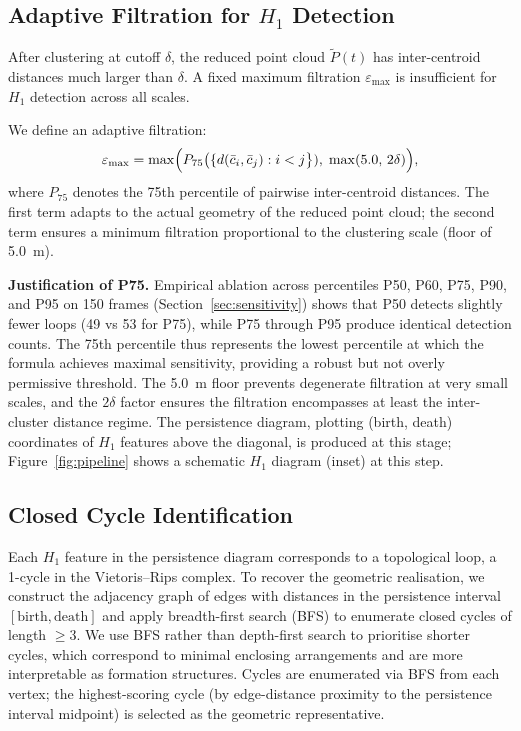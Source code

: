 \subsection{Adaptive Filtration for \(H_1\) Detection}
\label{sec:adaptive}

After clustering at cutoff \(\delta\), the reduced point cloud \(\tilde P(t)\) has inter-centroid distances much larger than \(\delta\). A fixed maximum filtration \(\varepsilon_{\max}\) is insufficient for \(H_1\) detection across all scales.

We define an adaptive filtration:
\begin{equation}
  \varepsilon_{\max}=\max\Bigl(
    P_{75}\bigl(\{d(\bar c_i,\bar c_j): i<j\bigr\}),\;
    \max(5.0,\,2\delta)
  \Bigr), \label{eq:adaptive}
\end{equation}
where \(P_{75}\) denotes the 75th percentile of pairwise inter-centroid distances. The first term adapts to the actual geometry of the reduced point cloud; the second term ensures a minimum filtration proportional to the clustering scale (floor of 5.0~m).

\textbf{Justification of P75.} Empirical ablation across percentiles P50, P60, P75, P90, and P95 on 150 frames (Section~\ref{sec:sensitivity}) shows that P50 detects slightly fewer loops (49 vs 53 for P75), while P75 through P95 produce identical detection counts. The 75th percentile thus represents the lowest percentile at which the formula achieves maximal sensitivity, providing a robust but not overly permissive threshold. The 5.0~m floor prevents degenerate filtration at very small scales, and the \(2\delta\) factor ensures the filtration encompasses at least the inter-cluster distance regime. The persistence diagram, plotting (birth, death) coordinates of \(H_1\) features above the diagonal, is produced at this stage; Figure~\ref{fig:pipeline} shows a schematic \(H_1\) diagram (inset) at this step.

\subsection{Closed Cycle Identification}

Each \(H_1\) feature in the persistence diagram corresponds to a topological loop, a 1-cycle in the Vietoris--Rips complex. To recover the geometric realisation, we construct the adjacency graph of edges with distances in the persistence interval \([\text{birth},\text{death}]\) and apply breadth-first search (BFS) to enumerate closed cycles of length \(\geq 3\). We use BFS rather than depth-first search to prioritise shorter cycles, which correspond to minimal enclosing arrangements and are more interpretable as formation structures. Cycles are enumerated via BFS from each vertex; the highest-scoring cycle (by edge-distance proximity to the persistence interval midpoint) is selected as the geometric representative.

